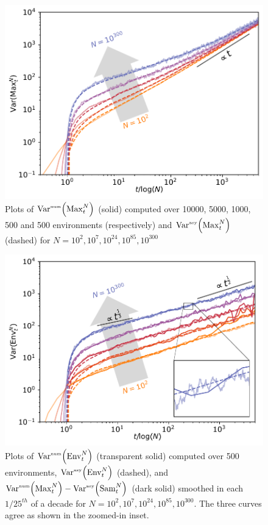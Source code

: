 \begin{figure}[h]
 \includegraphics[width=\columnwidth]{Figures/MaxVar.pdf}
 \caption{Plots of $\mathrm{Var}^{\textrm{\tiny{num}}}\!\left(\mathrm{Max}^{N}_t\right)$ (solid) computed over 10000, 5000, 1000, 500 and 500 environments (respectively) and  $\mathrm{Var}^{\textrm{\tiny{asy}}}\!\left(\mathrm{Max}^{N}_t\right)$ (dashed) for $N=10^2, 10^{7}, 10^{24}, 10^{85}, 10^{300}$}
 \label{fig:MaxVar}
\end{figure}

\begin{figure}[h]
	\includegraphics[width=\columnwidth]{Figures/QuantileVar.pdf}
	\caption{Plots of $\mathrm{Var}^{\textrm{\tiny{num}}}\!\left(\mathrm{Env}^{N}_t\right)$ (transparent solid) computed over 500 environments, $\mathrm{Var}^{\textrm{\tiny{asy}}}\!\left(\mathrm{Env}^{N}_t\right)$ (dashed), and $\mathrm{Var}^{\textrm{\tiny{num}}}\!\left(\mathrm{Max}^{N}_t\right) - \mathrm{Var}^{\textrm{\tiny{asy}}}\!\left(\mathrm{Sam}^{N}_t\right)$ (dark solid) smoothed in each $1/25^{th}$ of a decade for $N=10^2, 10^{7}, 10^{24}, 10^{85},10^{300}$. The three curves agree as shown in the zoomed-in inset.}
	\label{fig:QuantileVar}
\end{figure}

